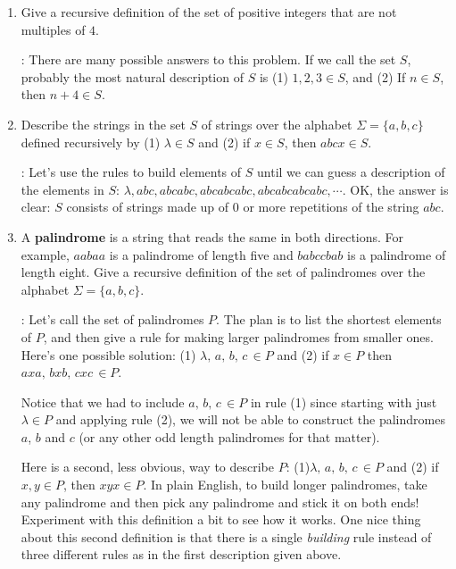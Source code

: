 \documentclass[11pt]{amsart}
\begin{document}
\begin{enumerate}


\item Give a recursive definition of the set of positive integers
that are not multiples of $4$.

: There are many possible answers to this problem. If we call the set $S$,
probably the most natural description of $S$ is (1) $1,2,3\in S$, and (2) If $n\in S$, then
$n+4\in S$.

\item Describe the strings in the  set $S$ of strings over the alphabet 
$\Sigma = \{a,b,c\}$
defined recursively by (1) $\lambda \in S$ and (2) if $x\in S$, then 
$abcx\in S$. 
\medskip

: Let's use the rules to build elements of $S$ until we can guess a
description of the elements in $S$: $\lambda, abc, abcabc, abcabcabc,  abcabcabcabc, \cdots$.
OK, the answer is clear: $S$ consists of strings made up of $0$ or more repetitions of
the string $abc$.
\medskip

\item A {\bf palindrome} is a string that reads the same in both
directions. For example, $aabaa$ is a palindrome of length five and
$babccbab$ is a palindrome of length eight. Give a recursive
definition of the set of palindromes over the alphabet
$\Sigma =\{a,b,c\}$. 

: Let's call the set of palindromes $P$. The plan is to list the shortest elements of $P$, and then give a rule
for making larger palindromes from smaller ones.
Here's one possible solution: (1) $\lambda,\, a,\, b,\, c\, \in P$ and (2)
if $x\in P$ then $axa,\, bxb,\, cxc\, \in P$.

Notice that we had to include $a,\, b,\, c\, \in P$ in rule (1) since starting with just 
$\lambda\in P$ and applying rule (2), we will not be able to construct the palindromes
$a$, $b$ and $c$ (or any other odd length palindromes for that matter).

Here is a second, less obvious, way to describe $P$: (1)$\lambda,\, a,\, b,\, c\, \in P$ and (2)
if $x, y\in P$, then $xyx\in P$. In plain English, to build longer palindromes, take
any palindrome and then pick  any palindrome and stick it on both ends! Experiment with this definition a
bit to see how it works. One nice thing about this second definition is that there is 
a single {\it building} rule instead of three different rules as in the first description
given above.


\end{enumerate}
\end{document}
